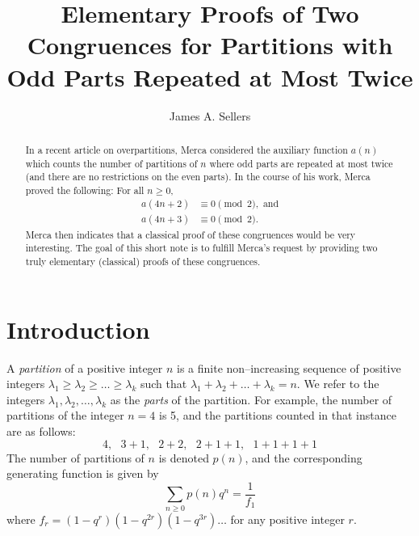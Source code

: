 \documentclass{amsart}
\begin{document}
	
\title[Partitions with Odd Parts Repeated at Most Twice]{Elementary Proofs of Two Congruences for Partitions with Odd Parts Repeated at Most Twice}
	

\author{James A. Sellers}
\address{Department of Mathematics and Statistics, University of Minnesota Duluth, Duluth, MN 55812, USA}

	
	
	
	
\maketitle
\begin{abstract}


In a recent article on overpartitions, Merca considered the auxiliary function $a(n)$ which counts the number of partitions of $n$ where odd parts are repeated at most twice (and there are no restrictions on the even parts).  In the course of his work, Merca proved the following:  
For all $n\geq 0$, 
\begin{align*}
a(4n+2) &\equiv 0 \pmod{2}, \textrm{\ \ and} \\
a(4n+3) &\equiv 0 \pmod{2}.
\end{align*}
Merca then indicates that a classical proof of these congruences would be very interesting. The goal of this short note is to fulfill Merca's request by providing two truly elementary (classical) proofs of these congruences.
\end{abstract}



\section{Introduction}  

A {\it partition} of a positive integer $n$ is a finite non--increasing sequence of positive integers $\lambda_1 \geq \lambda_2 \geq \dots \geq \lambda_k$ such that $\lambda_1 + \lambda_2 + \dots + \lambda_k = n.$  We refer to the integers $\lambda_1, \lambda_2, \dots, \lambda_k$ as the {\it parts} of the partition.  For example, the number of partitions of the integer $n=4$ is 5, and the partitions counted in that instance are as follows:  
$$4, \ \ \ 3+1, \ \ \ 2+2, \ \ \ 2+1+1, \ \ \ 1+1+1+1$$
The number of partitions of $n$ is denoted $p(n)$, and the corresponding generating function is given by 
\begin{equation}
\label{genfnp}
\sum_{n\geq 0}p(n)q^n = \frac{1}{f_1} 
\end{equation}
where $f_r = (1-q^r)(1-q^{2r})(1-q^{3r})\dots$ for any positive integer $r.$   
\end{document}
